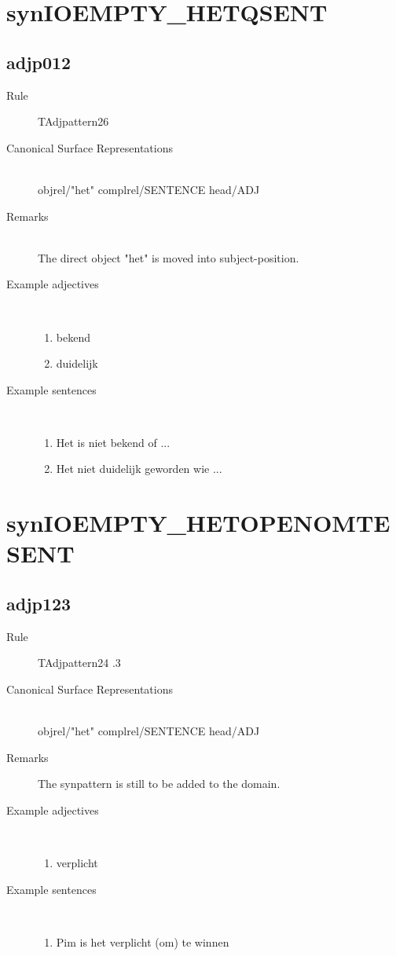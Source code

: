 \newpage
\section{synIOEMPTY\_HETQSENT}
  \subsection{adjp012}
\begin{description}
  \item [Rule] TAdjpattern26
  \item [Canonical Surface Representations]  \mbox{}\\ 
objrel/"het" complrel/SENTENCE head/ADJ
  \item [Remarks] \mbox{}\\
The direct object "het" is moved into subject-position.
  \item [Example adjectives]\mbox{}\\
\begin{enumerate}
  \item bekend
  \item duidelijk
\end{enumerate}
  \item [Example sentences]\mbox{}\\
\begin{enumerate}
  \item Het is niet bekend of ...
  \item Het niet duidelijk geworden wie ...
\end{enumerate}
\end{description}
\newpage
\section{synIOEMPTY\_HETOPENOMTESENT}
\subsection{adjp123}
\begin{description}
  \item [Rule] TAdjpattern24 .3
  \item [Canonical Surface Representations]  \mbox{}\\ objrel/"het" 
complrel/SENTENCE head/ADJ
  \item [Remarks] The synpattern is still to be added to the domain.
  \item [Example adjectives]\mbox{}\\
\begin{enumerate}
  \item verplicht
\end{enumerate}
  \item [Example sentences]\mbox{}\\
\begin{enumerate}
  \item Pim is het verplicht (om) te winnen
\end{enumerate}
\end{description}
\newpage

